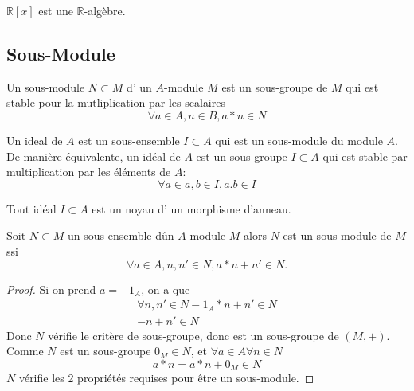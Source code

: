 \documentclass[../main.tex]{subfiles}
\begin{document}
$\mathbb{R}[x]$ est une $\mathbb{R}$-algèbre.
\subsection{Sous-Module}
\begin{defn}\label{defn:sous_module}
	Un sous-module $N \subset M$ d' un $A$-module $M$ est un sous-groupe de $M$ qui est stable pour la mutliplication par les scalaires
	\[ 
	\forall a \in A, n \in B, a\ast n \in N
	\]
	
\end{defn}
\begin{defn}[Ideal]\label{defn:ideal}
	Un ideal de $A$ est un sous-ensemble $I \subset A$ qui est un sous-module du module $A$. De manière équivalente, un idéal de $A$ est un sous-groupe $I \subset A$ qui est stable  par multiplication par les éléments de $A$:
	\[ 
	\forall a \in a, b \in I, a.b \in I
	\]
	
\end{defn}
\begin{rmq}
Tout idéal $I \subset A$ est un noyau d' un morphisme d'anneau.
\end{rmq}
\begin{lemma}
	Soit $N\subset M$ un sous-ensemble dûn $A$-module $M$ alors $N$ est un sous-module de $M$ ssi
	\[ 
	\forall a \in A, n,n' \in N, a \ast n + n' \in N.
	\]
	

\end{lemma}
\begin{proof}
Si on prend $a=-1_A$, on a que 
\begin{align*}
\forall n,n' \in N -1_A \ast n + n'\in N\\
-n + n' \in N
\end{align*}
Donc $N$ vérifie le critère de sous-groupe, donc est un sous-groupe de $(M,+)$.\\
Comme $N$ est un sous-groupe $0_M \in N$, et $\forall a \in A \forall n \in N$ 
\[ 
a\ast n = a\ast n + 0_M \in N
\]
$N$ vérifie les 2 propriétés requises pour être un sous-module.
\end{proof}
\end{document}

